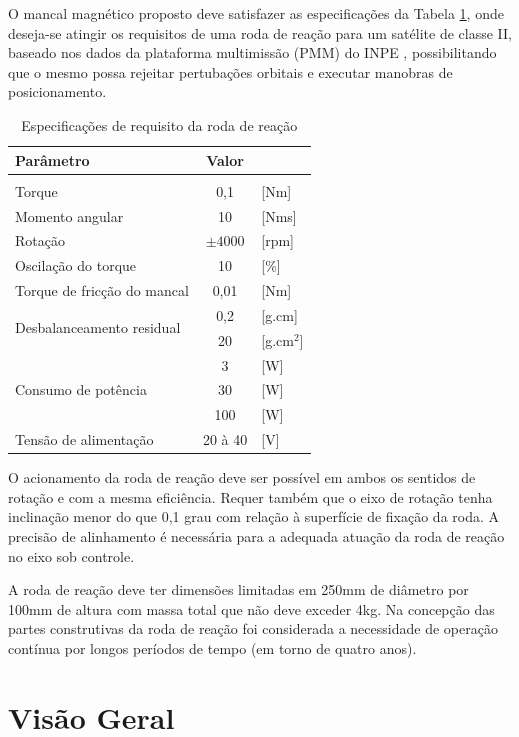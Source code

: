 O mancal magnético proposto deve satisfazer as especificações da Tabela \ref{tab:PMM:especificações}, onde deseja-se atingir os requisitos de uma roda de reação para um satélite de classe II, baseado nos dados da plataforma multimissão (PMM) do INPE \citep{Veloso2009}, possibilitando que o mesmo possa rejeitar pertubações orbitais e executar manobras de posicionamento. 

\begin{table}[!ht]
    \centering
    \begin{tabular}{l c l }
		Parâmetro & Valor &   \\
       	\hline \\
 		Torque   						  & 0,1 & [Nm]  \\
 		Momento angular  				  & 10 &      [Nms] \\
 		Rotação 							  & $\pm4000$ & [rpm] \\
 		Oscilação do torque 				  & 10  & [\%] \\
 		Torque de fricção do mancal 		  & 0,01 & [Nm] \\
 		\multirow{2}{*}{Desbalanceamento residual} & 0,2 & [g.cm]\\
 		 & 20  & [g.cm$^{2}$]  \\
 		\multirow{3}{*}{Consumo de potência} 
 		& 3 & [W] 	 \\
 		& 30 & [W] \\
 		& 100 & [W] 	\\	
 		Tensão de alimentação  & 20 à 40 & [V]  \\
    \end{tabular}
    \caption{Especificações de requisito da roda de reação}
    \label{tab:PMM:especificações}
\end{table}

O acionamento da roda de reação deve ser possível em ambos os sentidos de rotação e com a mesma eficiência. Requer também que o eixo de rotação tenha inclinação menor do que 0,1 grau com relação à superfície de fixação da roda. A precisão de alinhamento é necessária para a adequada atuação da roda de reação no eixo sob controle.

A roda de reação deve ter dimensões limitadas em 250mm de diâmetro por 100mm de altura com massa total que não deve exceder 4kg. Na concepção das partes construtivas da roda de reação foi considerada a necessidade de operação contínua por longos períodos de tempo (em torno de quatro anos).

\section{Visão Geral}

